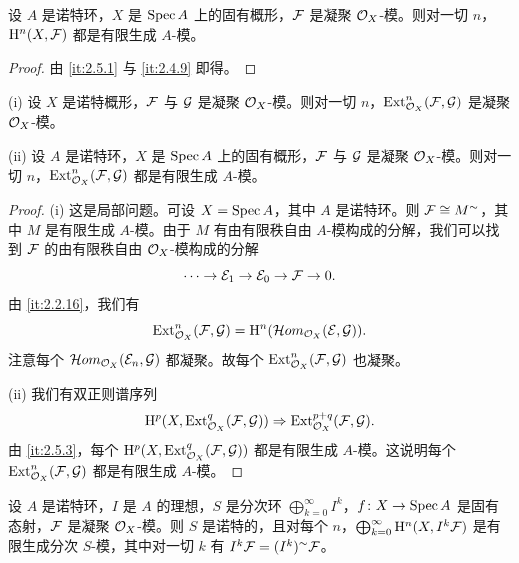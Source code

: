 \begin{corollary}[有限性定理]\label{it:2.5.3}
设 $A$ 是诺特环，$X$ 是 $\operatorname{Spec} A$ 上的固有概形，$\mathcal{F}$ 是凝聚 $\mathcal{O}_X$-模。则对一切 $n$，$\mathrm{H}^n(X,\mathcal{F})$ 都是有限生成 $A$-模。
\end{corollary}

\begin{proof}
由 \ref{it:2.5.1} 与 \ref{it:2.4.9} 即得。
\end{proof}

\begin{corollary}\label{it:2.5.4}
(i) 设 $X$ 是诺特概形，$\mathcal{F}$ 与 $\mathcal{G}$ 是凝聚 $\mathcal{O}_X$-模。则对一切 $n$，$\operatorname{Ext}^n_{\mathcal{O}_X}(\mathcal{F},\mathcal{G})$ 是凝聚 $\mathcal{O}_X$-模。

(ii) 设 $A$ 是诺特环，$X$ 是 $\operatorname{Spec} A$ 上的固有概形，$\mathcal{F}$ 与 $\mathcal{G}$ 是凝聚 $\mathcal{O}_X$-模。则对一切 $n$，$\operatorname{Ext}^n_{\mathcal{O}_X}(\mathcal{F},\mathcal{G})$ 都是有限生成 $A$-模。
\end{corollary}
\begin{proof}
(i) 这是局部问题。可设 $X=\operatorname{Spec} A$，其中 $A$ 是诺特环。则 $\mathcal{F}\cong M^{\sim}$，其中 $M$ 是有限生成 $A$-模。由于 $M$ 有由有限秩自由 $A$-模构成的分解，我们可以找到 $\mathcal{F}$ 的由有限秩自由 $\mathcal{O}_X$-模构成的分解
\[
\cdots\to\mathcal{E}_1\to\mathcal{E}_0\to\mathcal{F}\to 0.
\]
由 \ref{it:2.2.16}，我们有
\[
\operatorname{Ext}^n_{\mathcal{O}_X}(\mathcal{F},\mathcal{G})=\mathrm{H}^n(\mathcal{H}om_{\mathcal{O}_X}(\mathcal{E},\mathcal{G})).
\]
注意每个 $\mathcal{H}om_{\mathcal{O}_X}(\mathcal{E}_n,\mathcal{G})$ 都凝聚。故每个 $\operatorname{Ext}^n_{\mathcal{O}_X}(\mathcal{F},\mathcal{G})$ 也凝聚。

(ii) 我们有双正则谱序列
\[
\mathrm{H}^p(X,\operatorname{Ext}^q_{\mathcal{O}_X}(\mathcal{F},\mathcal{G}))\Rightarrow\operatorname{Ext}^{p+q}_{\mathcal{O}_X}(\mathcal{F},\mathcal{G}).
\]
由 \ref{it:2.5.3}，每个 $\mathrm{H}^p(X,\operatorname{Ext}^q_{\mathcal{O}_X}(\mathcal{F},\mathcal{G}))$ 都是有限生成 $A$-模。这说明每个 $\operatorname{Ext}^n_{\mathcal{O}_X}(\mathcal{F},\mathcal{G})$ 都是有限生成 $A$-模。
\end{proof}

\begin{lemma}\label{it:2.5.5}
设 $A$ 是诺特环，$I$ 是 $A$ 的理想，$S$ 是分次环 $\bigoplus_{k=0}^\infty I^k$，$f\colon X\to\operatorname{Spec} A$ 是固有态射，$\mathcal{F}$ 是凝聚 $\mathcal{O}_X$-模。则 $S$ 是诺特的，且对每个 $n$，$\bigoplus_{k=0}^\infty \mathrm{H}^n(X,I^k\mathcal{F})$ 是有限生成分次 $S$-模，其中对一切 $k$ 有 $I^k\mathcal{F}=(I^k)^{\sim}\mathcal{F}$。
\end{lemma}

